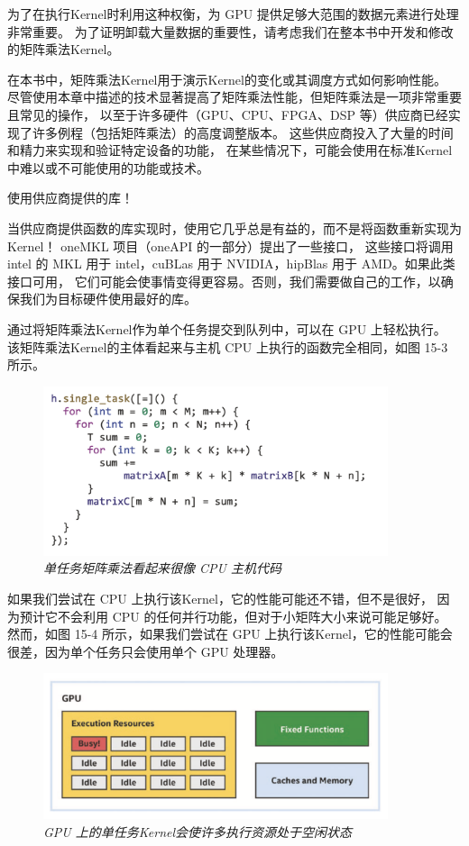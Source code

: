 为了在执行Kernel时利用这种权衡，为 GPU 提供足够大范围的数据元素进行处理非常重要。 
为了证明卸载大量数据的重要性，请考虑我们在整本书中开发和修改的矩阵乘法Kernel。

\begin{remark}[关于矩阵乘法的提醒]
	在本书中，矩阵乘法Kernel用于演示Kernel的变化或其调度方式如何影响性能。
	尽管使用本章中描述的技术显著提高了矩阵乘法性能，但矩阵乘法是一项非常重要且常见的操作，
	以至于许多硬件（GPU、CPU、FPGA、DSP 等）供应商已经实现了许多例程（包括矩阵乘法）的高度调整版本。
	这些供应商投入了大量的时间和精力来实现和验证特定设备的功能，
	在某些情况下，可能会使用在标准Kernel中难以或不可能使用的功能或技术。

使用供应商提供的库！

当供应商提供函数的库实现时，使用它几乎总是有益的，而不是将函数重新实现为Kernel！
oneMKL 项目（oneAPI 的一部分）提出了一些接口，
这些接口将调用 intel 的 MKL 用于 intel，cuBLas 用于 NVIDIA，hipBlas 用于 AMD。如果此类接口可用，
它们可能会使事情变得更容易。否则，我们需要做自己的工作，以确保我们为目标硬件使用最好的库。
\end{remark}

通过将矩阵乘法Kernel作为单个任务提交到队列中，可以在 GPU 上轻松执行。 
该矩阵乘法Kernel的主体看起来与主机 CPU 上执行的函数完全相同，如图 15-3 所示。

\begin{figure}[H]
	\centering
	\includegraphics[width=0.9\textwidth]{figs/F15.3.png}
	\caption{\textit{单任务矩阵乘法看起来很像 CPU 主机代码 }}
\end{figure}

如果我们尝试在 CPU 上执行该Kernel，它的性能可能还不错，但不是很好，
因为预计它不会利用 CPU 的任何并行功能，但对于小矩阵大小来说可能足够好。 
然而，如图 15-4 所示，如果我们尝试在 GPU 上执行该Kernel，它的性能可能会很差，因为单个任务只会使用单个 GPU 处理器。

\begin{figure}[H]
	\centering
	\includegraphics[width=0.9\textwidth]{figs/F15.4.png}
	\caption{\textit{GPU 上的单任务Kernel会使许多执行资源处于空闲状态 }}
\end{figure}

